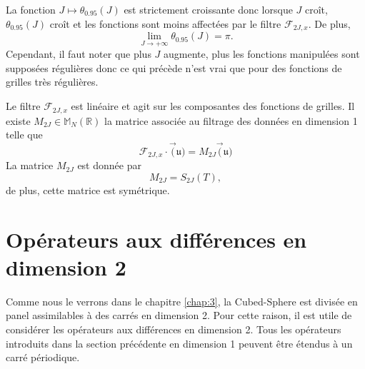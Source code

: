 La fonction $J \mapsto \theta_{0.95}(J)$ est strictement croissante donc lorsque $J$ croît, $\theta_{0.95}(J)$ croît et les fonctions sont moins affectées par le filtre $\mathcal{F}_{2J,x}$. De plus, 
\begin{equation}
\lim_{J \rightarrow +\infty} \theta_{0.95}(J) = \pi.
\end{equation}
Cependant, il faut noter que plus $J$ augmente, plus les fonctions manipulées sont supposées régulières donc ce qui précède n'est vrai que pour des fonctions de grilles très régulières.

\begin{remarque}
Le filtre $\mathcal{F}_{2J,x}$ est linéaire et agit sur les composantes des fonctions de grilles. Il existe $M_{2J} \in \mathbb{M}_N \left( \mathbb{R} \right)$ la matrice associée au filtrage des données en dimension 1 telle que
\begin{equation}
\mathcal{F}_{2J,x} \cdot \vec(\mathfrak{u}) = M_{2J} \vec(\mathfrak{u})
\end{equation}
La matrice $M_{2J}$ est donnée par
\begin{equation}
M_{2J} = S_{2J}(T),
\label{eq:matrice_filtrage}
\end{equation}
de plus, cette matrice est symétrique.
\end{remarque}































\section{Opérateurs aux différences en dimension 2}

Comme nous le verrons dans le chapitre \ref{chap:3}, la Cubed-Sphere est divisée en panel assimilables à des carrés en dimension 2. Pour cette raison, il est utile de considérer les opérateurs aux différences en dimension 2. Tous les opérateurs introduits dans la section précédente en dimension 1 peuvent être étendus à un carré périodique.


